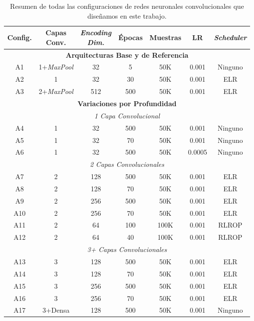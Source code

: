 \renewcommand{\tablename}{Tabla}
\renewcommand{\listtablename}{Índice de Tablas}
\begin{table}[htbp]
\centering
\caption{Resumen de todas las configuraciones de redes neuronales convolucionales que diseñamos en este trabajo.}
\label{tab:autoencoder_configs}
\small
\begin{tabular}{|c|c|c|c|c|c|c|}
\hline
\textbf{Config.} & \textbf{Capas Conv.} & \textbf{\emph{Encoding Dim.}} & \textbf{Épocas} & \textbf{Muestras} & \textbf{LR} & \textbf{\emph{Scheduler}} \\
\hline
\hline
\multicolumn{7}{|c|}{\textbf{Arquitecturas Base y de Referencia}} \\
\hline
A1 & 1+\emph{MaxPool} & 32 & 5 & 50K & 0.001 & Ninguno \\
A2 & 1 & 32 & 30 & 50K & 0.001 & ELR \\
A3 & 2+\emph{MaxPool} & 512 & 500 & 50K & 0.001 & ELR \\
\hline
\hline
\multicolumn{7}{|c|}{\textbf{Variaciones por Profundidad}} \\
\hline
\multicolumn{7}{|c|}{\textit{1 Capa Convolucional}} \\
\hline
A4 & 1 & 32 & 500 & 50K & 0.001 & Ninguno \\
A5 & 1 & 32 & 70 & 50K & 0.001 & Ninguno \\
A6 & 1 & 32 & 500 & 50K & 0.0005 & Ninguno \\
\hline
\multicolumn{7}{|c|}{\textit{2 Capas Convolucionales}} \\
\hline
A7 & 2 & 128 & 500 & 50K & 0.001 & ELR \\
A8 & 2 & 128 & 70 & 50K & 0.001 & ELR \\
A9 & 2 & 256 & 500 & 50K & 0.001 & ELR \\
A10 & 2 & 256 & 70 & 50K & 0.001 & ELR \\
A11 & 2 & 64 & 100 & 100K & 0.001 & RLROP \\
A12 & 2 & 64 & 40 & 100K & 0.001 & RLROP \\
\hline
\multicolumn{7}{|c|}{\textit{3+ Capas Convolucionales}} \\
\hline
A13 & 3 & 128 & 500 & 50K & 0.001 & ELR \\
A14 & 3 & 128 & 70 & 50K & 0.001 & ELR \\
A15 & 3 & 256 & 500 & 50K & 0.001 & ELR \\
A16 & 3 & 256 & 70 & 50K & 0.001 & ELR \\
A17 & 3+Densa & 128 & 500 & 50K & 0.001 & Ninguno \\

\end{tabular}
\end{table}
